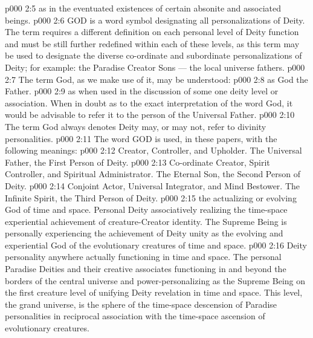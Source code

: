 \vs p000 2:5 \bibnobreakspace {} as in the eventuated existences of certain absonite and associated beings.
\vs p000 2:6 GOD is a word symbol designating all personalizations of Deity. The term requires a different definition on each personal level of Deity function and must be still further redefined within each of these levels, as this term may be used to designate the diverse co\hyp{}ordinate and subordinate personalizations of Deity; for example: the Paradise Creator Sons --- the local universe fathers.
\vs p000 2:7 \pc The term God, as we make use of it, may be understood:
\vs p000 2:8  as God the Father.
\vs p000 2:9  as when used in the discussion of some one deity level or association. When in doubt as to the exact interpretation of the word God, it would be advisable to refer it to the person of the Universal Father.
\vs p000 2:10 \pc The term God always denotes  Deity may, or may not, refer to divinity personalities.
\vs p000 2:11 \pc The word GOD is used, in these papers, with the following meanings:
\vs p000 2:12 \bibnobreakspace {} Creator, Controller, and Upholder. The Universal Father, the First Person of Deity.
\vs p000 2:13 \bibnobreakspace {} Co\hyp{}ordinate Creator, Spirit Controller, and Spiritual Administrator. The Eternal Son, the Second Person of Deity.
\vs p000 2:14 \bibnobreakspace {} Conjoint Actor, Universal Integrator, and Mind Bestower. The Infinite Spirit, the Third Person of Deity.
\vs p000 2:15 \bibnobreakspace {} the actualizing or evolving God of time and space. Personal Deity associatively realizing the time\hyp{}space experiential achievement of creature\hyp{}Creator identity. The Supreme Being is personally experiencing the achievement of Deity unity as the evolving and experiential God of the evolutionary creatures of time and space.
\vs p000 2:16 \bibnobreakspace {} Deity personality anywhere actually functioning in time and space. The personal Paradise Deities and their creative associates functioning in and beyond the borders of the central universe and power\hyp{}personalizing as the Supreme Being on the first creature level of unifying Deity revelation in time and space. This level, the grand universe, is the sphere of the time\hyp{}space descension of Paradise personalities in reciprocal association with the time\hyp{}space ascension of evolutionary creatures.
